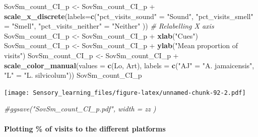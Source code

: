 \documentclass[]{article}
\newenvironment{Shaded}{\begin{snugshade}}{\end{snugshade}}
\newcommand{\KeywordTok}[1]{\textcolor[rgb]{0.13,0.29,0.53}{\textbf{{#1}}}}
\newcommand{\DataTypeTok}[1]{\textcolor[rgb]{0.13,0.29,0.53}{{#1}}}
\newcommand{\StringTok}[1]{\textcolor[rgb]{0.31,0.60,0.02}{{#1}}}
\newcommand{\CommentTok}[1]{\textcolor[rgb]{0.56,0.35,0.01}{\textit{{#1}}}}
\newcommand{\NormalTok}[1]{{#1}}
\let\oldparagraph\paragraph
\renewcommand{\paragraph}[1]{\oldparagraph{#1}\mbox{}}
\begin{document}
\begin{Shaded}
\begin{Highlighting}[]
\NormalTok{SovSm_count_CI_p <-}\StringTok{ }\NormalTok{SovSm_count_CI_p +}\StringTok{ }\KeywordTok{scale_x_discrete}\NormalTok{(}\DataTypeTok{labels=}\KeywordTok{c}\NormalTok{(}\StringTok{"pct_visits_sound"} \NormalTok{=}\StringTok{ "Sound"}\NormalTok{, }\StringTok{"pct_visits_smell"} \NormalTok{=}\StringTok{ "Smell"}\NormalTok{,}
                              \StringTok{"pct_visits_neither"} \NormalTok{=}\StringTok{ "Neither"} \NormalTok{))  }\CommentTok{# Relabelling X axis}
\NormalTok{SovSm_count_CI_p <-}\StringTok{ }\NormalTok{SovSm_count_CI_p +}\StringTok{ }\KeywordTok{xlab}\NormalTok{(}\StringTok{"Cues"}\NormalTok{)}
\NormalTok{SovSm_count_CI_p <-}\StringTok{ }\NormalTok{SovSm_count_CI_p +}\StringTok{ }\KeywordTok{ylab}\NormalTok{(}\StringTok{"Mean proportion of visits"}\NormalTok{)}
\NormalTok{SovSm_count_CI_p <-}\StringTok{ }\NormalTok{SovSm_count_CI_p +}\StringTok{  }\KeywordTok{scale_color_manual}\NormalTok{(}\DataTypeTok{values =} \KeywordTok{c}\NormalTok{(Lo, Art), }\DataTypeTok{labels =} \KeywordTok{c}\NormalTok{(}\StringTok{"AJ"} \NormalTok{=}\StringTok{ "A. jamaicensis"}\NormalTok{, }\StringTok{"L"} \NormalTok{=}\StringTok{ "L. silvicolum"}\NormalTok{))}
\NormalTok{SovSm_count_CI_p   }
\end{Highlighting}
\end{Shaded}

\texttt{[image: Sensory\_learning\_files/figure-latex/unnamed-chunk-92-2.pdf]}

\begin{Shaded}
\begin{Highlighting}[]
\CommentTok{#ggsave("SovSm_count_CI_p.pdf", width = zz  )}
\end{Highlighting}
\end{Shaded}

\paragraph{Plotting \% of visits to the different
platforms}\label{plotting-of-visits-to-the-different-platforms-2}
\end{document}
